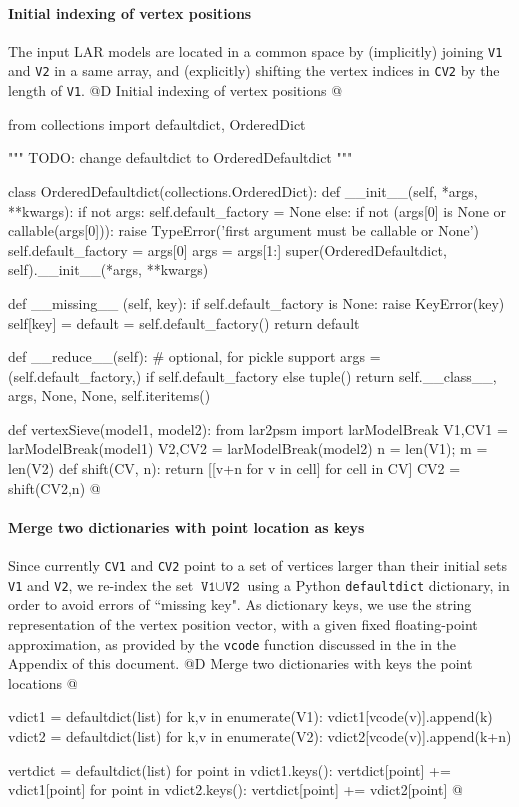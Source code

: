 \documentclass[11pt,oneside]{article}	%
\begin{document}
\paragraph{Initial indexing of vertex positions}
The input LAR models are located in a common space by (implicitly) joining \texttt{V1} and \texttt{V2} in a same array, and (explicitly) shifting the vertex indices in \texttt{CV2} by the length of \texttt{V1}.
@D Initial indexing of vertex positions
@{from collections import defaultdict, OrderedDict

""" TODO: change defaultdict to OrderedDefaultdict """

class OrderedDefaultdict(collections.OrderedDict):
	def __init__(self, *args, **kwargs):
		if not args:
			self.default_factory = None
		else:
			if not (args[0] is None or callable(args[0])):
				raise TypeError('first argument must be callable or None')
			self.default_factory = args[0]
			args = args[1:]
		super(OrderedDefaultdict, self).__init__(*args, **kwargs)

	def __missing__ (self, key):
		if self.default_factory is None:
			raise KeyError(key)
		self[key] = default = self.default_factory()
		return default

	def __reduce__(self):  # optional, for pickle support
		args = (self.default_factory,) if self.default_factory else tuple()
		return self.__class__, args, None, None, self.iteritems()


def vertexSieve(model1, model2):
	from lar2psm import larModelBreak
	V1,CV1 = larModelBreak(model1) 
	V2,CV2 = larModelBreak(model2)
	n = len(V1); m = len(V2)
	def shift(CV, n): 
		return [[v+n for v in cell] for cell in CV]
	CV2 = shift(CV2,n)
@}

\paragraph{Merge two dictionaries with point location as keys}
Since currently \texttt{CV1} and \texttt{CV2} point to a set of vertices larger than their initial sets 
\texttt{V1} and \texttt{V2}, we re-index the set $\texttt{V1} \cup \texttt{V2}$ using a Python \texttt{defaultdict} dictionary, in order to avoid errors of ``missing key". As dictionary keys, we use the string representation of the vertex position vector, with a given fixed floating-point approximation, as provided by the \texttt{vcode} function discussed in the in the Appendix of this document.
@D Merge two dictionaries with keys the point locations
@{	
	vdict1 = defaultdict(list)
	for k,v in enumerate(V1): vdict1[vcode(v)].append(k) 
	vdict2 = defaultdict(list)
	for k,v in enumerate(V2): vdict2[vcode(v)].append(k+n) 
	
	vertdict = defaultdict(list)
	for point in vdict1.keys(): vertdict[point] += vdict1[point]
	for point in vdict2.keys(): vertdict[point] += vdict2[point]
@}
\end{document}
